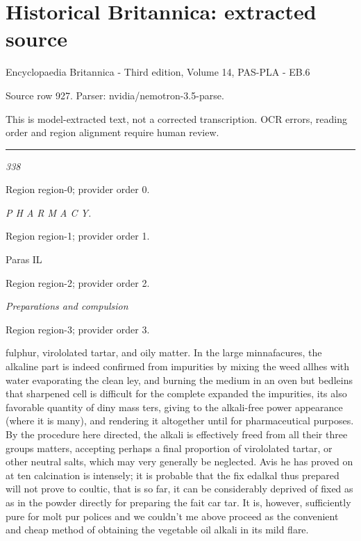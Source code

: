 \documentclass[11pt]{article}
\begin{document}
\section*{Historical Britannica: extracted source}
Encyclopaedia Britannica - Third edition, Volume 14, PAS-PLA - EB.6\par
{\small Source row 927. Parser: nvidia/nemotron-3.5-parse.\par}
{\small This is model-extracted text, not a corrected transcription. OCR errors, reading order and region alignment require human review.\par}
\hrule\medskip
{\small\itshape 338\par}

{\scriptsize\color{gray} Region region-0; provider order 0.\par}
\medskip

{\small\itshape P H A R M A C Y.\par}

{\scriptsize\color{gray} Region region-1; provider order 1.\par}
\medskip

Paras IL
\par

{\scriptsize\color{gray} Region region-2; provider order 2.\par}
\medskip

{\small\itshape Preparations and compulsion\par}

{\scriptsize\color{gray} Region region-3; provider order 3.\par}
\medskip

fulphur, virololated tartar, and oily matter. In the large minnafacures, the alkaline part is indeed confirmed from impurities by mixing the weed allhes with water evaporating the clean ley, and burning the medium in an oven but bedleins that sharpened cell is difficult for the complete expanded the impurities, its also favorable quantity of diny mass ters, giving to the alkali-free power appearance (where it is many), and rendering it altogether until for pharmaceutical purposes. By the procedure here directed, the alkali is effectively freed from all their three groups matters, accepting perhaps a final proportion of virololated tartar, or other neutral salts, which may very generally be neglected. Avis he has proved on at ten calcination is intensely; it is probable that the fix edalkal thus prepared will not prove to coultic, that is so far, it can be considerably deprived of fixed as as in the powder directly for preparing the fait car tar. It is, however, sufficiently pure for molt pur polices and we couldn't me above proceed as the convenient and cheap method of obtaining the vegetable oil alkali in its mild flare.
\par
\end{document}
